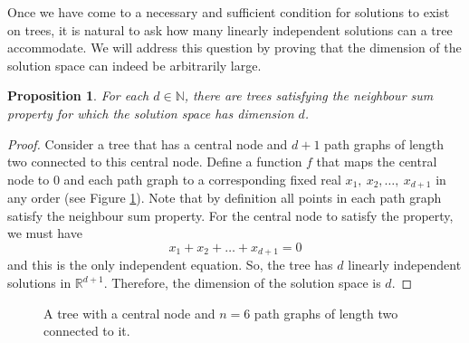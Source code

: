 \documentclass[11pt]{article}
\newtheorem{prp}[nummer]{Proposition}
\begin{document}
Once we have come to a necessary and sufficient condition for solutions to exist on trees, it is natural to ask how many linearly independent solutions can a tree accommodate. We will address this question by proving that the dimension of the solution space can indeed be arbitrarily large.

\begin{prp}
    For each $d\in \mathbb N$, there are trees satisfying the neighbour sum property for which the solution space has dimension $d$.
\end{prp}
\begin{proof}
    Consider a tree that has a central node and $d+1$ path graphs of length two connected to this central node. Define a function $f$ that maps the central node to $0$ and each path graph to a corresponding fixed real $x_1,\:x_2,\ldots,\:x_{d+1}$ in any order (see Figure \ref{central}). Note that by definition all points in each path graph satisfy the neighbour sum property. For the central node to satisfy the property, we must have
    $$x_1+x_2+\ldots+x_{d+1}=0$$
    and this is the only independent equation. So, the tree has $d$ linearly independent solutions in $\mathbb{R}^{d+1}$. Therefore, the dimension of the solution space is $d$.
\end{proof}

\begin{figure}[htp!]
    \centering
        \caption{A tree with a central node and $n=6$ path graphs of length two connected to it.}
    \label{central}
\end{figure}
\end{document}
